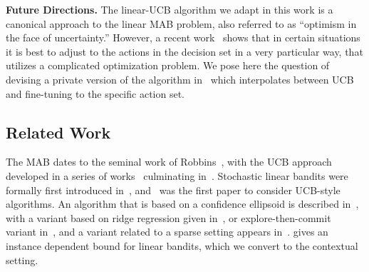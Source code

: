 \documentclass{article}
\renewcommand{\paragraph}[1]{\vspace{2pt}\noindent\textbf{#1}}
\begin{document}
\paragraph{Future Directions.} The linear-UCB algorithm we adapt in this work is a canonical approach to the linear MAB problem, also referred to as ``optimism in the face of uncertainty.'' However, a recent work~\cite{LattimoreS17} shows that in certain situations it is best to adjust to the actions in the decision set in a very particular way, that utilizes a complicated optimization problem. We pose here the question of devising a private version of the algorithm in~\cite{LattimoreS17} which interpolates between UCB and fine-tuning to the specific action set. 
\vspace{-0.5mm}
\subsection{Related Work}
\label{subsec:related_work}
The MAB dates to the seminal work of Robbins~\cite{robbins1952}, with the UCB approach developed in a series of works~\cite{BanditBook85,Agrawal95} culminating in~\cite{Auer2002}.  Stochastic linear bandits were formally first introduced in~\cite{Abe2003}, and~\cite{Auer2003UCB} was the first paper to consider UCB-style algorithms. An algorithm that is based on a confidence ellipsoid is described in~\cite{DaniStochasticLinearOptimization2008}, with a variant based on ridge regression given in~\cite{ChuLRS11}, or explore-then-commit variant in~\cite{RusmevichientongT10}, and a variant related to a sparse setting appears in~\cite{Abbasi-YadkoriPS12}. \cite{AbbasiYadkoriImprovedAlgorithmsLinear2011} gives an instance dependent bound for linear bandits, which we convert to the contextual setting.
\end{document}
